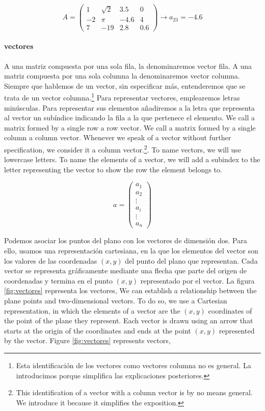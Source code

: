 \begin{equation*}
A=
\begin{pmatrix}
1& \sqrt{2}& 3.5& 0\\
-2& \pi& -4.6& 4\\
7& -19& 2.8& 0.6
\end{pmatrix}
\rightarrow a_{23}=-4.6
\end{equation*}
\begin{paracol}{2}
\paragraph{vectores}
A una matriz compuesta por una sola fila, la denominaremos vector fila. A una matriz compuesta por una sola columna la denominaremos vector columna. Siempre que hablemos de un vector, sin especificar más, entenderemos que se trata de un vector columna.\footnote{Esta identificación de los vectores como vectores columna no es general. La introducimos porque simplifica las explicaciones posteriores.} Para representar vectores, emplearemos letras minúsculas. Para representar sus elementos añadiremos a la letra que representa al vector un subíndice indicando la fila a la que pertenece el elemento.
\switchcolumn
We call a matrix formed by a single row a row vector. We call a matrix formed by a single column a column vector. Whenever we speak of a vector without further specification, we consider it a column vector.\footnote{This identification of a vector with a column vector is by no means general. We introduce it because it simplifies the exposition.}. To name vectors, we will use lowercase letters. To name the elements of a vector, we will add a subindex to the letter representing the vector to show the row the element belongs to. 
\end{paracol}
\begin{equation*}
a=
\begin{pmatrix}
a_1\\
a_2\\
\vdots \\
a_i\\
\vdots \\
a_n
\end{pmatrix}
\end{equation*}
\begin{paracol}{2}
Podemos asociar los puntos del plano con los vectores de dimensión dos. Para ello, usamos una representación cartesiana, en la que los elementos del vector son los valores de las coordenadas $(x,y)$ del punto del plano que representan. Cada vector se representa gráficamente mediante una flecha que parte del origen de coordenadas y termina en el punto $(x,y)$ representado por el vector. La figura \ref{fig:vectores} representa los vectores,
\switchcolumn
We can establish a relationship between the plane points and two-dimensional vectors. To do so, we use a Cartesian representation, in which the elements of a vector are the $(x,y)$ coordinates of the point of the plane they represent. Each vector is drawn using an arrow that starts at the origin of the coordinates and ends at the point $(x,y)$ represented by the vector. Figure \ref{fig:vectores} represents vectors, 
\end{paracol}
